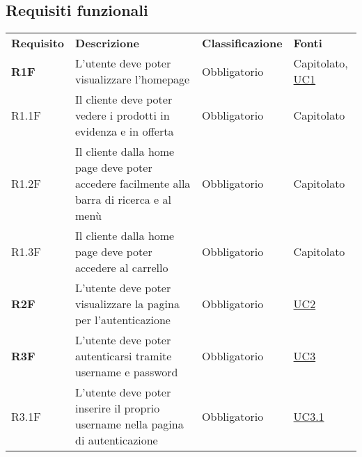 \subsection{Requisiti funzionali}
\begin{center}
    \centering
    \renewcommand{\arraystretch}{1.5}
    \label{tab:RequisitiFunzionali}
    \begin{longtable}[!h]{p{50px} p{210px} p{80px} p{50px}}
        \rowcolor{logo!70} \textbf{Requisito} & \textbf{Descrizione}                                                                             & \textbf{Classificazione} & \textbf{Fonti}                \\
        \textbf{R1F}                                    & L'utente deve poter visualizzare l'homepage                                                      & Obbligatorio             & Capitolato, \newline \hyperref[sec:UC1]{UC1}       \\
        R1.1F                                           & Il cliente deve poter vedere i prodotti in evidenza e in offerta                                 & Obbligatorio             & Capitolato       \\
        R1.2F                                           & Il cliente dalla home page deve poter accedere facilmente alla barra di ricerca e al menù        & Obbligatorio             & Capitolato\\
        R1.3F                                           & Il cliente dalla home page deve poter accedere al carrello                                       & Obbligatorio             & Capitolato \\
        \textbf{R2F}                                    & L'utente deve poter visualizzare la pagina per l'autenticazione                                  & Obbligatorio             & \hyperref[sec:UC2]{UC2}       \\
        \textbf{R3F}                                    & L'utente deve poter autenticarsi tramite username e password                                    & Obbligatorio             & \hyperref[sec:UC3]{UC3} \\
        R3.1F                                           & L'utente deve poter inserire il proprio username nella pagina di autenticazione                  & Obbligatorio             & \hyperref[sec:UC3]{UC3.1}     \\

\end{longtable}
\end{center}
